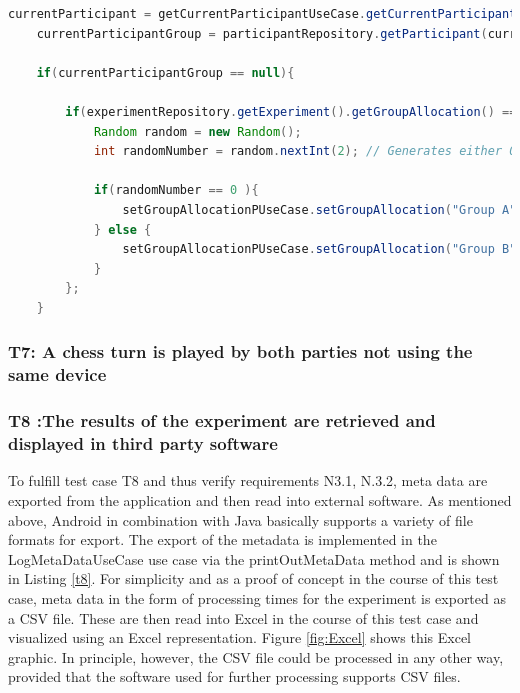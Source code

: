 \begin{lstlisting}[language=java,label=t6,lineskip={0pt}, caption=Collect time needed to conduct experiment (b), basicstyle=\scriptsize, captionpos=b]
    currentParticipant = getCurrentParticipantUseCase.getCurrentParticipant();
    currentParticipantGroup = participantRepository.getParticipant(currentParticipant).getGroupAllocation();
    
    if(currentParticipantGroup == null){
    
        if(experimentRepository.getExperiment().getGroupAllocation() == "random"){
            Random random = new Random();
            int randomNumber = random.nextInt(2); // Generates either 0 or 1
    
            if(randomNumber == 0 ){
                setGroupAllocationPUseCase.setGroupAllocation("Group A", currentParticipant);
            } else {
                setGroupAllocationPUseCase.setGroupAllocation("Group B", currentParticipant);
            }
        };
    }
\end{lstlisting}

\newpage\subsubsection*{T7: A chess turn is played by both parties not using the same device}

\vspace{1cm}

\newpage\subsubsection*{T8 :The results of the experiment are retrieved and displayed in third party software}

To fulfill test case T8 and thus verify requirements N3.1, N.3.2, meta data are exported from the application and then read into external software. As mentioned above, Android in combination with Java basically supports a variety of file formats for export. The export of the metadata is implemented in the LogMetaDataUseCase use case via the printOutMetaData method and is shown in Listing \ref{t8}. For simplicity and as a proof of concept in the course of this test case, meta data in the form of processing times for the experiment is exported as a CSV file. These are then read into Excel in the course of this test case and visualized using an Excel representation. Figure \ref{fig:Excel} shows this Excel graphic. In principle, however, the CSV file could be processed in any other way, provided that the software used for further processing supports CSV files. 

